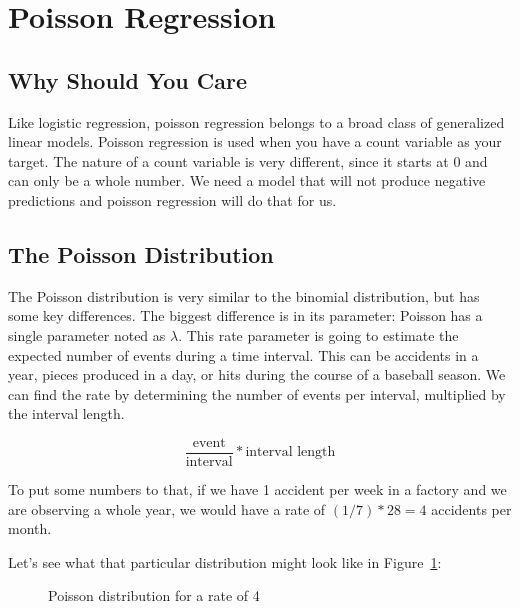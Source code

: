 \documentclass[
  letterpaper,
]{krantz}
\begin{document}
\section{Poisson Regression}\label{sec-glm-poisson}

\subsection{Why Should You Care}\label{sec-glm-poisson-why}

Like logistic regression, poisson regression belongs to a broad class of
generalized linear models. Poisson regression is used when you have a
count variable as your target. The nature of a count variable is very
different, since it starts at 0 and can only be a whole number. We need
a model that will not produce negative predictions and poisson
regression will do that for us.

\subsection{The Poisson
Distribution}\label{sec-glm-poisson-distribution}

The Poisson distribution is very similar to the binomial distribution,
but has some key differences. The biggest difference is in its
parameter: Poisson has a single parameter noted as \(\lambda\). This
rate parameter is going to estimate the expected number of events during
a time interval. This can be accidents in a year, pieces produced in a
day, or hits during the course of a baseball season. We can find the
rate by determining the number of events per interval, multiplied by the
interval length.

\[\frac{\text{event}}{\text{interval}}*\text{interval length} \]

To put some numbers to that, if we have 1 accident per week in a factory
and we are observing a whole year, we would have a rate of
\((1 / 7) * 28 = 4\) accidents per month.

Let's see what that particular distribution might look like in
Figure~\ref{fig-poisson-distribution}:

\begin{figure}[H]


\caption{\label{fig-poisson-distribution}Poisson distribution for a rate
of 4}

\end{figure}%
\end{document}
